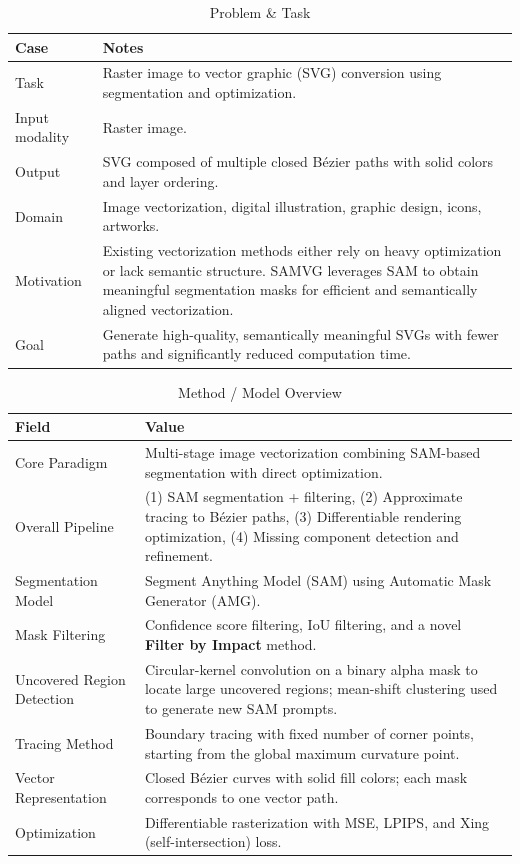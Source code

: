 \begin{table}[h!]
\centering
\caption{Problem \& Task}
\begin{tabular}{|l|p{10cm}|}
\hline
\textbf{Case} & \textbf{Notes} \\ \hline
Task &
Raster image to vector graphic (SVG) conversion using segmentation and optimization. \\ \hline
Input modality &
Raster image. \\ \hline
Output &
SVG composed of multiple closed Bézier paths with solid colors and layer ordering. \\ \hline
Domain &
Image vectorization, digital illustration, graphic design, icons, artworks. \\ \hline
Motivation &
Existing vectorization methods either rely on heavy optimization or lack semantic structure. SAMVG leverages SAM to obtain meaningful segmentation masks for efficient and semantically aligned vectorization. \\ \hline
Goal &
Generate high-quality, semantically meaningful SVGs with fewer paths and significantly reduced computation time. \\ \hline
\end{tabular}
\end{table}


\begin{table}[h!]
\centering
\caption{Method / Model Overview}
\begin{tabular}{|l|p{10cm}|}
\hline
\textbf{Field} & \textbf{Value} \\ \hline
Core Paradigm &
Multi-stage image vectorization combining SAM-based segmentation with direct optimization. \\ \hline
Overall Pipeline &
(1) SAM segmentation + filtering,
(2) Approximate tracing to Bézier paths,
(3) Differentiable rendering optimization,
(4) Missing component detection and refinement. \\ \hline
Segmentation Model &
Segment Anything Model (SAM) using Automatic Mask Generator (AMG). \\ \hline
Mask Filtering &
Confidence score filtering, IoU filtering, and a novel \textbf{Filter by Impact} method. \\ \hline
Uncovered Region Detection &
Circular-kernel convolution on a binary alpha mask to locate large uncovered regions; mean-shift clustering used to generate new SAM prompts. \\ \hline
Tracing Method &
Boundary tracing with fixed number of corner points, starting from the global maximum curvature point. \\ \hline
Vector Representation &
Closed Bézier curves with solid fill colors; each mask corresponds to one vector path. \\ \hline
Optimization &
Differentiable rasterization with MSE, LPIPS, and Xing (self-intersection) loss. \\ \hline
\end{tabular}
\end{table}

